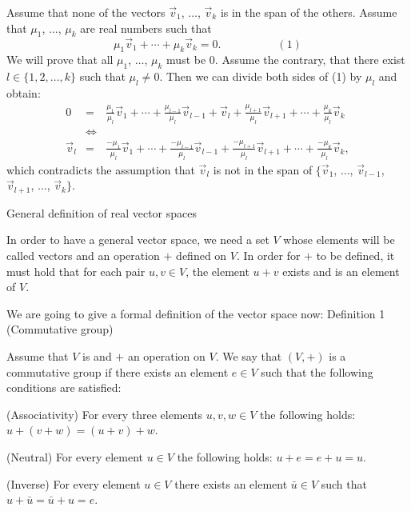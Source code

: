 Assume that none of the vectors \( \overrightarrow v_1 \), \( \dots \), \( \overrightarrow v_k \) is in the span of the others. Assume that \( \mu_1 \), \( \dots \), \( \mu_k \) are real numbers such that \[ \mu_1\overrightarrow v_1+\cdots+\mu_k\overrightarrow v_k=0.\quad\quad\quad\quad\quad (1)\] We will prove that all \( \mu_1 \), \( \dots \), \( \mu_k \) must be \( 0 \). Assume the contrary, that there exist \( l\in\{1,2,\dots, k\} \) such that \( \mu_l\neq 0 \). Then we can divide both sides of (1) by \( \mu_l \) and obtain: \begin{eqnarray*}0&=&\frac{\mu_1}{\mu_l}\overrightarrow v_1+\cdots+ \frac{\mu_{l-1}}{\mu_l}\overrightarrow v_{l-1}+ \overrightarrow v_l+ \frac{\mu_{l+1}}{\mu_l}\overrightarrow v_{l+1}+\cdots+\frac{\mu_k}{\mu_l}\overrightarrow v_k \\ &\Leftrightarrow &\\ \overrightarrow v_l&=&\frac{-\mu_1}{\mu_l}\overrightarrow v_1 +\cdots+ \frac{-\mu_{l-1}}{\mu_l}\overrightarrow v_{l-1} + \frac{-\mu_{l+1}}{\mu_l}\overrightarrow v_{l+1}+\cdots+\frac{-\mu_k}{\mu_l}\overrightarrow v_k, \end{eqnarray*} which contradicts the assumption that \( \overrightarrow v_l \) is not in the span of \( \{\overrightarrow v_1 \), \( \dots \), \( \overrightarrow v_{l-1} \), \( \overrightarrow v_{l+1} \), \( \dots \), \( \overrightarrow v_k\} \).

General definition of real vector spaces

In order to have a general vector space, we need a set \( V \) whose elements will be called vectors and an operation \( + \) defined on \( V \). In order for \( + \) to be defined, it must hold that for each pair \( u,v\in V \), the element \( u+v \) exists and is an element of \( V \).

We are going to give a formal definition of the vector space now:
Definition 1 (Commutative group)


Assume that \( V \) is and \( + \) an operation on \( V \). We say that \( (V,+) \) is a commutative group if there exists an element \( e\in V \) such that the following conditions are satisfied:

    (Associativity) For every three elements \( u, v,w\in V \) the following holds: \( u+(v+w)=(u+v)+w \).

    (Neutral) For every element \( u\in V \) the following holds: \( u+e=e+u=u \).

    (Inverse) For every element \( u\in V \) there exists an element \( \bar u\in V \) such that \( u+\bar u=\bar u+u=e \).

